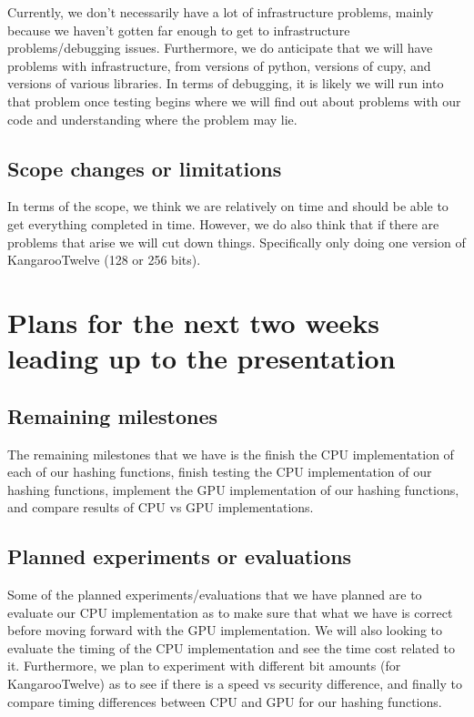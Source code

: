 \documentclass[conference]{IEEEtran}
\begin{document}
Currently, we don't necessarily have a lot of infrastructure problems, mainly because we haven't gotten far enough to get to infrastructure problems/debugging issues. Furthermore, we do anticipate that we will have problems with infrastructure, from versions of python, versions of cupy, and versions of various libraries. In terms of debugging, it is likely we will run into that problem once testing begins where we will find out about problems with our code and understanding where the problem may lie.

\subsection{Scope changes or limitations}

In terms of the scope, we think we are relatively on time and should be able to get everything completed in time. However, we do also think that if there are problems that arise we will cut down things. Specifically only doing one version of KangarooTwelve (128 or 256 bits). 

\section{Plans for the next two weeks leading up to the presentation}

\subsection{Remaining milestones}

The remaining milestones that we have is the finish the CPU implementation of each of our hashing functions, finish testing the CPU implementation of our hashing functions, implement the GPU implementation of our hashing functions, and compare results of CPU vs GPU implementations.

\subsection{Planned experiments or evaluations}

Some of the planned experiments/evaluations that we have planned are to evaluate our CPU implementation as to make sure that what we have is correct before moving forward with the GPU implementation. We will also looking to evaluate the timing of the CPU implementation and see the time cost related to it. Furthermore, we plan to experiment with different bit amounts (for KangarooTwelve) as to see if there is a speed vs security difference, and finally to compare timing differences between CPU and GPU for our hashing functions.
\end{document}
